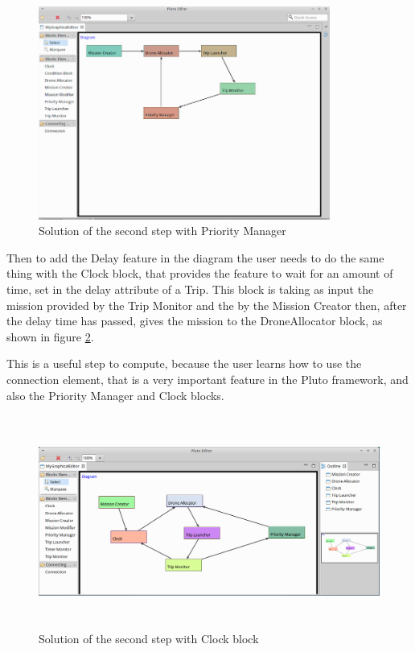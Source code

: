 \begin{figure}[htb]
  \centering
  \includegraphics[width=\linewidth,height=7cm]{pictures/secondStep.png}
  \caption{Solution of the second step with Priority Manager}
  \label{fig:secondStepPriority}
\end{figure}

Then to add the Delay feature in the diagram the user needs to do the same thing with the Clock block, that provides the feature to wait for an amount of time, set in the delay attribute of a Trip. This block is taking as input the mission provided by the Trip Monitor and the by the Mission Creator then, after the delay time has passed, gives the mission to the DroneAllocator block, as shown in figure \ref{fig:secondStepClock}.

This is a useful step to compute, because the user learns how to use the connection element, that is a very important feature in the Pluto framework, and also the Priority Manager and Clock blocks.

\begin{figure}[htb]
  \centering
  \includegraphics[width=\linewidth,height=7cm]{pictures/secondStepClock.png}
  \caption{Solution of the second step with Clock block}
  \label{fig:secondStepClock}
\end{figure}


